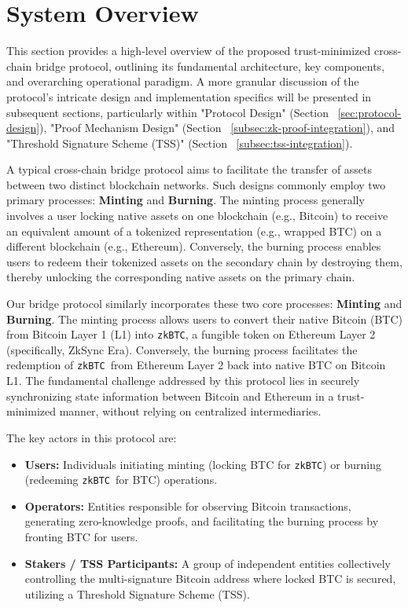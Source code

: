 \documentclass{DESSThesis}
\newcommand{\zktoken}{\texttt{zkBTC}}
\begin{document}
\section{System Overview} \label{sec:system_overview}

This section provides a high-level overview of the proposed trust-minimized cross-chain bridge protocol, outlining its fundamental architecture, key components, and overarching operational paradigm. A more granular discussion of the protocol's intricate design and implementation specifics will be presented in subsequent sections, particularly within "Protocol Design" (Section ~\ref{sec:protocol-design}), "Proof Mechanism Design" (Section ~\ref{subsec:zk-proof-integration}), and "Threshold Signature Scheme (TSS)" (Section ~\ref{subsec:tss-integration}).

A typical cross-chain bridge protocol aims to facilitate the transfer of assets between two distinct blockchain networks. Such designs commonly employ two primary processes: \textbf{Minting} and \textbf{Burning}. The minting process generally involves a user locking native assets on one blockchain (e.g., Bitcoin) to receive an equivalent amount of a tokenized representation (e.g., wrapped BTC) on a different blockchain (e.g., Ethereum). Conversely, the burning process enables users to redeem their tokenized assets on the secondary chain by destroying them, thereby unlocking the corresponding native assets on the primary chain.

Our bridge protocol similarly incorporates these two core processes: \textbf{Minting} and \textbf{Burning}. The minting process allows users to convert their native Bitcoin (BTC) from Bitcoin Layer 1 (L1) into \zktoken, a fungible token on Ethereum Layer 2 (specifically, ZkSync Era). Conversely, the burning process facilitates the redemption of \zktoken\ from Ethereum Layer 2 back into native BTC on Bitcoin L1. The fundamental challenge addressed by this protocol lies in securely synchronizing state information between Bitcoin and Ethereum in a trust-minimized manner, without relying on centralized intermediaries.

The key actors in this protocol are:
\begin{itemize}
    \item \textbf{Users:} Individuals initiating minting (locking BTC for \zktoken) or burning (redeeming \zktoken\ for BTC) operations.
    \item \textbf{Operators:} Entities responsible for observing Bitcoin transactions, generating zero-knowledge proofs, and facilitating the burning process by fronting BTC for users.
    \item \textbf{Stakers / TSS Participants:} A group of independent entities collectively controlling the multi-signature Bitcoin address where locked BTC is secured, utilizing a Threshold Signature Scheme (TSS).
\end{itemize}
\end{document}
